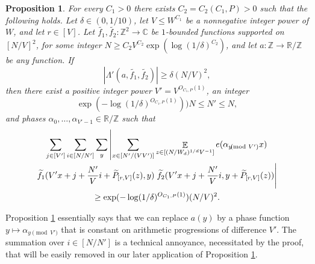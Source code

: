 \documentclass[11pt]{amsart}
\newtheorem{proposition}[lemma]{Proposition}
\theoremstyle{definition}
\DeclareMathOperator*{\E}{\mathbb{E}}
\newcommand{\R}{{\mathbb R}}
\newcommand{\Z}{{\mathbb Z}}
\begin{document}
\begin{proposition}\label{prop:iterate-popular-a-value}
For every $C_1>0$ there exists $C_2=C_2(C_1,P)>0$ such that the following holds. Let $\delta\in(0, 1/10)$, let $V\leq W^{C_1}$ be a nonnegative integer power of $W$, and let $r\in[V]$. Let $\widetilde{f_1},\widetilde{f_2}: \Z^2 \to \mathbb{C}$ be $1$-bounded functions supported on $[N/V]^2$, for some integer $N\geq C_2 V^{C_2}\exp(\log(1/\delta)^{C_2})$, and let $a: \Z \to \mathbb{R}/\mathbb{Z}$ be any function.  If
$$|\Lambda'(a,\widetilde{f_1}, \widetilde{f_2})| \geq \delta (N/V)^{2},$$
then %
there exist a positive integer power $V' = V^{O_{C_1, P}(1)}$, an integer $$\exp(-\log(1/\delta)^{O_{C_1, P}(1)}))N\leq N'\leq N,$$ and phases $\alpha_{0}, \ldots, \alpha_{V'-1}\in \R/\Z$
such that
\begin{multline*}
    \sum_{j\in[V']}\sum_{i\in [N/N']}\sum_y\left|\sum_{x\in [N'/(VV')]} \E_{z \in [(N/W_d)^{1/d}V^{-1}]} e(\alpha_{y\!\!\!\!\pmod{V'}} x)\right.\\ 
     \widetilde{f_1}(V'x + j + \frac{N'}{V}i+\widetilde P_{[r, V]}(z),y)
     \left. \widetilde{f_2}(V'x + j + \frac{N'}{V}i,y+\widetilde P_{[r, V]}(z))\vphantom{\sum_x} \right|\\
     \geq \exp(-\log(1/\delta)^{O_{C_1, P}(1)})(N/V)^2.
\end{multline*}
\end{proposition}
Proposition \ref{prop:iterate-popular-a-value} essentially says that we can replace $a(y)$ by a phase function $y\mapsto \alpha_{y\pmod{V'}}$ that is constant on arithmetic progressions of difference $V'$. The summation over $i\in[N/N']$ is a technical annoyance, necessitated by the proof, that will be easily removed in our later application of Proposition \ref{prop:iterate-popular-a-value}.
\end{document}
